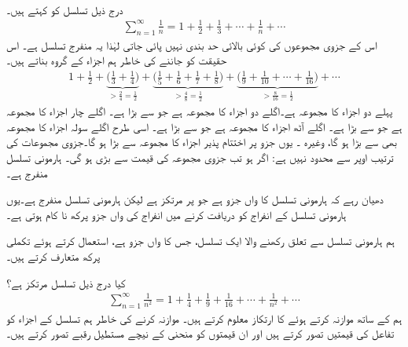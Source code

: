 \\
درج ذیل تسلسل کو  کہتے ہیں۔
\begin{align*}
\sum_{n=1}^{\infty}\frac{1}{n}=1+\frac{1}{2}+\frac{1}{3}+\cdots+\frac{1}{n}+\cdots
\end{align*}
اس کے جزوی مجموعوں کی کوئی بالائی حد بندی نہیں پائی جاتی  لہٰذا یہ   منفرج تسلسل ہے۔ اس حقیقت کو جاننے کی خاطر ہم اجزاء کے گروہ بناتے ہیں۔
\begin{align*}
1+\frac{1}{2}+\underbrace{\big(\frac{1}{3}+\frac{1}{4}\big)}_{>\tfrac{2}{4}=\tfrac{1}{2}}+\underbrace{\big(\frac{1}{5}+\frac{1}{6}+\frac{1}{7}+\frac{1}{8}\big)}_{>\tfrac{4}{8}=\tfrac{1}{2}}+\underbrace{\big(\frac{1}{9}+\frac{1}{10}+\cdots+\frac{1}{16}\big)}_{>\tfrac{8}{16}=\tfrac{1}{2}}+\cdots
\end{align*}
پہلے دو اجزاء کا مجموعہ  ہے۔اگلے دو اجزاء کا مجموعہ  ہے جو  سے بڑا ہے۔ اگلے چار اجزاء کا مجموعہ  ہے جو  سے بڑا ہے۔ اگلے آٹھ اجزاء کا مجموعہ
  ہے جو   سے بڑا ہے۔ اسی طرح اگلے سولہ اجزاء کا مجموعہ بھی  سے بڑا ہو گا، وغیرہ ۔ یوں جزو  پر اختتام پذیر   اجزاء کا مجموعہ  سے بڑا ہو گا۔جزوی مجموعات کی ترتیب اوپر سے محدود نہیں ہے: اگر  ہو تب جزوی مجموعہ  کی قیمت  سے بڑی ہو گی۔ ہارمونی تسلسل منفرج ہے۔

دھیان رہے کہ ہارمونی تسلسل کا  واں جزو  ہے جو  پر مرتکز ہے لیکن ہارمونی تسلسل منفرج ہے۔یوں ہارمونی تسلسل کے انفراج کو دریافت کرنے میں انفراج کی   واں جزو پرکھ  نا کام  ہوتی  ہے۔

ہم ہارمونی تسلسل سے تعلق رکھنے والا ایک تسلسل، جس کا  واں جزو  ہے،  استعمال کرتے ہوئے تکملی پرکھ   متعارف کرتے ہیں۔

کیا درج ذیل تسلسل مرتکز ہے؟
\begin{align*}
\sum_{n=1}^{\infty}\frac{1}{n^2}=1+\frac{1}{4}+\frac{1}{9}+\frac{1}{16}+\cdots+\frac{1}{n^2}+\cdots
\end{align*}
ہم  کے ساتھ موازنہ کرتے ہوئے  کا  ارتکاز  معلوم کرتے ہیں۔ موازنہ کرنے کی خاطر ہم تسلسل کے اجزاء کو تفاعل  کی قیمتیں تصور کرتے ہیں اور ان قیمتوں کو منحنی  کے نیچے مستطیل رقبے تصور کرتے ہیں۔

